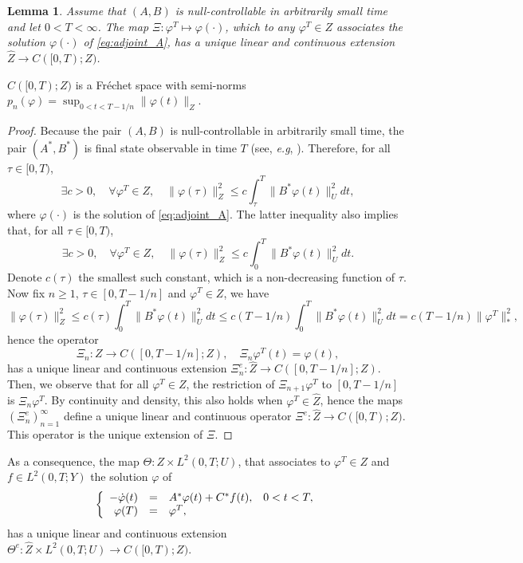 \documentclass[10pt]{article}
\newtheorem{Lemma}[Theorem]{Lemma}
\begin{document}
\begin{Lemma}\label{lem:distrib_reg}
Assume that $(A,B)$ is null-controllable in arbitrarily small time and let $0 < T < \infty$. The map $\Xi : \varphi^T \mapsto \varphi(\cdot)$, which to any $\varphi^T \in Z$ associates the solution $\varphi(\cdot)$ of \eqref{eq:adjoint_A}, has a unique linear and continuous extension $ \hat{Z} \rightarrow  C([0,T);Z)$.
\end{Lemma}
$C([0,T);Z)$ is a Fréchet space with semi-norms $p_n(\varphi) = \sup_{0 < t < T-1/n} \|\varphi(t)\|_Z$.
\begin{proof}
Because the pair $(A,B)$ is null-controllable in arbitrarily small time, the pair $(A^*,B^*)$ is final state observable in time $T$ (see, \textit{e.g}, \cite[Theorem 11.2.1.]{tucsnak2009observation}). Therefore, for all $\tau \in [0,T)$, 
\[
\exists c > 0,\quad \forall \varphi^T \in Z,\quad \|\varphi(\tau)\|_Z^2 \leq c \int_\tau^T  \|B^*\varphi(t) \|_U^2 dt,
\]
where $\varphi(\cdot)$ is the solution of \eqref{eq:adjoint_A}. The latter inequality also implies that, for all $\tau \in [0,T)$,
\[
\exists c > 0,\quad \forall \varphi^T \in Z,\quad \|\varphi(\tau)\|_Z^2 \leq c \int_0^T  \|B^*\varphi(t) \|_U^2 dt.
\]
Denote $c(\tau)$ the smallest such constant, which is a non-decreasing function of $\tau$. Now fix $n \geq 1$, $\tau \in [0,T-1/n]$ and $\varphi^T \in Z$, we have 
\[
\| \varphi(\tau) \|_Z^2 \leq c(\tau) \int_0^T  \|B^*\varphi(t) \|_U^2 dt \leq c(T-1/n) \int_0^T  \|B^*\varphi(t) \|_U^2 dt = c(T-1/n) \| \varphi^T \|_*^2,
\]
hence the operator 
\[
\Xi_n : Z \rightarrow C([0,T-1/n];Z),\quad \Xi_n \varphi^T(t) = \varphi(t),
\]
has a unique linear and continuous extension $\Xi_n^e : \hat{Z} \rightarrow C([0,T-1/n];Z)$. Then, we observe that for all $\varphi^T \in Z$, the restriction of $\Xi_{n+1}\varphi^T$ to $[0,T-1/n]$ is $\Xi_n\varphi^T$. By continuity and density, this also holds when $\varphi^T \in \hat{Z}$, hence the maps $(\Xi_n^e)_{n=1}^\infty$ define a unique linear and continuous operator $\Xi^e : \hat{Z} \rightarrow C([0,T);Z)$. This operator is the unique extension of $\Xi$. 
\end{proof}
As a consequence, the map $\Theta : Z \times L^2(0,T;U)$, that  associates to $\varphi^T \in Z$ and $f \in L^2(0,T;Y)$ the solution $\varphi$ of 
\[
\left\lbrace \begin{array}{rcl c}
-\dot{\varphi}(t) &=& A^*\varphi(t) + C^*f(t),& 0 < t < T,\\
\varphi(T) &=& \varphi^T,
\end{array}\right.
\]
has a unique linear and continuous extension $\Theta^e : \hat{Z} \times L^2(0,T;U) \rightarrow C([0,T);Z)$. 
\end{document}
